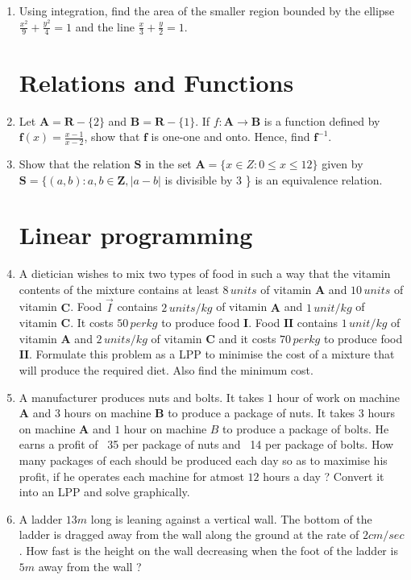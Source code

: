 \documentclass[12pt,-letter paper]{article}
\let\vec\mathbf{}
\let\vec\mathbf{}
\let\vec\mathbf{}
\providecommand{\brak}[1]{\ensuremath{\left(#1\right)}}
\begin{document}
\begin{enumerate}
\item Using integration, find the area of the smaller region bounded by the ellipse $\frac{x^{2}}{9}+\frac{y^{2}}{4}=1$ and the line $\frac{x}{3}+\frac{y}{2}=1$.

\section{Relations and Functions}
\item Let $\vec{A}= \vec{R} - \{2\}$ and $\vec{B} = \vec{R} - \{1\}$. If $f : \vec{A} \rightarrow \vec{B}$ is a function defined by $\vec{f}\brak{x}=\frac{x-1}{x-2}$, show that $\vec{f}$ is one-one and onto. Hence, find $\vec{f}^{-1}$.

\item Show that the relation $\vec{S}$ in the set $\vec{A} = \{x \in Z : 0  \le x  \le 12\}$ given by $\vec{S} = \{\brak{a, b} : a, b \in \vec{Z},  \vert a-b \vert$ is divisible by $ 3 $ \} is an equivalence relation.

\section{Linear programming}

\item A dietician wishes to mix two types of food in such a way that the vitamin contents of the mixture contains at least $8 \hspace{2pt}units$ of vitamin $\vec{A}$ and $10\hspace{2pt}units$ of vitamin $\vec{C} $. Food $\Vec{I} $ contains $2\hspace{2pt} units/kg$ of vitamin $\vec{A}$ and $1\hspace{2pt} unit/kg$ of vitamin $\vec{C}$. It costs \rupee$50 \hspace{2pt}per kg$ to produce food $\vec{I}$. Food $\vec{II}$ contains $1 \hspace{2pt}unit/kg$ of vitamin $\vec{A}$ and $2\hspace{2pt} units/kg$ of vitamin $\vec{C}$ and it costs \rupee $70\hspace{2pt} per kg$ to produce food $\vec{II}$. Formulate this problem as a LPP to minimise the cost of a mixture that will produce the required diet. Also find the minimum cost.


\item A manufacturer produces nuts and bolts. It takes $1$ hour of work on machine $\vec{A}$ and $3$ hours on machine $\vec{B}$ to produce a package of nuts. It takes $3$ hours on machine $\vec{A}$ and $1$ hour on machine $B$ to produce a package of bolts. He earns a profit of \rupee~35 per package of nuts and \rupee~14 per package of bolts. How many packages of each should be produced each day so as to maximise his profit, if he operates each machine for atmost $12$ hours a day ? Convert it into an LPP and solve graphically.

\item A ladder $13 m$ long is leaning against a vertical wall. The bottom of the ladder is dragged away from the wall along the ground at the rate of $2 cm/sec$. How fast is the height on the wall decreasing when the foot of the ladder is $5 m$ away from the wall ?


\end{enumerate}
\end{document}
